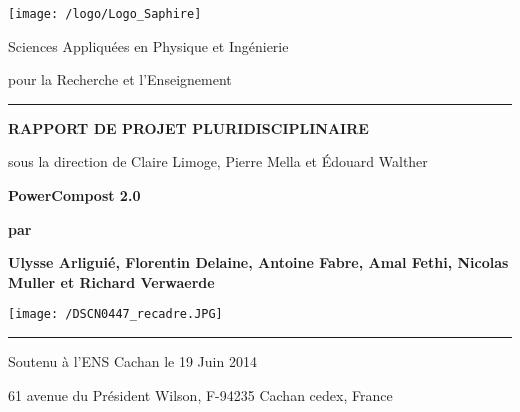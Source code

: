 \documentclass[../PS6_RapportFinal.tex]{subfiles}
\begin{document}
\graphicspath{{img/}{tex/img/}}

\thispagestyle{empty}
\enlargethispage{1cm}\vspace*{-2cm}
\begin{center}\normalfont\bfseries


\noindent\hspace*{-2.5cm}\texttt{[image: /logo/Logo\_Saphire]}

\par\vspace{.25cm}  Sciences Appliquées en Physique et Ingénierie  \par pour la Recherche et l'Enseignement\\
  \rule{\linewidth}{.25mm}


\par\vspace{1cm}  \textnormal{\bfseries RAPPORT DE PROJET PLURIDISCIPLINAIRE}

\par\vspace{.25cm} %
\par\textnormal{sous la direction de Claire Limoge, Pierre Mella et Édouard Walther}


\par{} \textnormal{\bfseries\huge PowerCompost 2.0}
\par\vspace{.5cm} {\bfseries par}
\par\vspace{.5cm}\textnormal{\bfseries\Large Ulysse Arliguié, Florentin Delaine, Antoine Fabre, Amal Fethi, Nicolas Muller et Richard Verwaerde}
\par{}\texttt{[image: /DSCN0447\_recadre.JPG]}

\par{}
   \rule{\linewidth}{.25mm}
\par\textnormal{Soutenu à l'ENS Cachan le 19 Juin 2014}
\par\textnormal{61 avenue du Président Wilson, F-94235 Cachan cedex, France}
\end{center}
\end{document}
